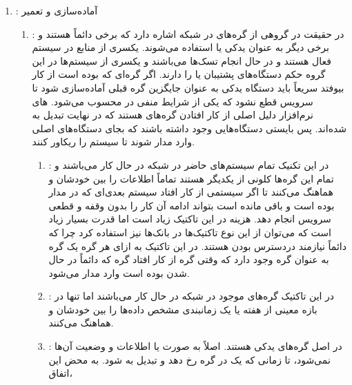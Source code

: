 \begin{enumerate}
    \item {}: آماده‌سازی و تعمیر
    \begin{enumerate}
        \item {}: در حقیقت در گروهی از گره‌های در شبکه اشاره
        دارد که برخی دائماً  هستند و برخی دیگر به عنوان یدکی یا
         استفاده می‌شوند. یکسری از منابع در سیستم فعال هستند و در حال
        انجام تسک‌ها می‌باشند و یکسری از سیستم‌ها در این گروه حکم دستگاه‌های
        پشتیبان یا  را دارند. اگر گره‌ای که  بوده است از
        کار بیوفتد سریعاً باید دستگاه یدکی به عنوان جایگزین گره قبلی آماده‌سازی
        شود تا سرویس قطع نشود که یکی از شرایط منفی در  محسوب
        می‌شود. های نرم‌افزار دلیل اصلی از کار افتادن گره‌های
         هستند که در نهایت تبدیل به  شده‌اند. پس بایستی
        دستگاه‌هایی وجود داشته باشند که بجای دستگاه‌های اصلی وارد مدار شوند تا
        سیستم را ریکاور کنند.
        \begin{enumerate}
            \item {}: در این
            تکنیک تمام سیستم‌های حاضر در شبکه در حال کار می‌باشند و تمام این
            گره‌ها کلونی از یکدیگر هستند تماماً اطلاعات را بین خودشان 
            و هماهنگ می‌کنند تا اگر سیستمی از کار افتاد سیستم بعدی‌ای که در مدار
            بوده است و باقی مانده است بتواند ادامه آن کار را بدون وقفه و قطعی
            سرویس انجام دهد. هزینه در این تاکتیک زیاد است اما قدرت
             بسیار زیاد است که می‌توان از این نوع تاکتیک‌ها در
            بانک‌ها نیز استفاده کرد چرا که دائماً نیازمند دردسترس بودن هستند. در
            این تاکتیک به ازای هر گره یک گره به عنوان گره  وجود
            دارد که وقتی گره  از کار افتاد گره  که دائماً
            در حال  شدن بوده است وارد مدار می‌شود.
            \item {}: در این تاکتیک گره‌های
            موجود در شبکه در حال کار می‌باشند اما تنها در بازه معینی از هفته یا
            یک زمانبندی مشخص داده‌ها را بین خودشان  و هماهنگ می‌کنند.
            \item {}: در اصل گره‌های یدکی  هستند. اصلاً به صورت  یا  اطلاعات و
            وضعیت آن‌ها  نمی‌شود، تا زمانی که یک  در گره
             رخ دهد و تبدیل به  شود. به محض این اتفاق،

\end{enumerate}
\end{enumerate}
\end{enumerate}
